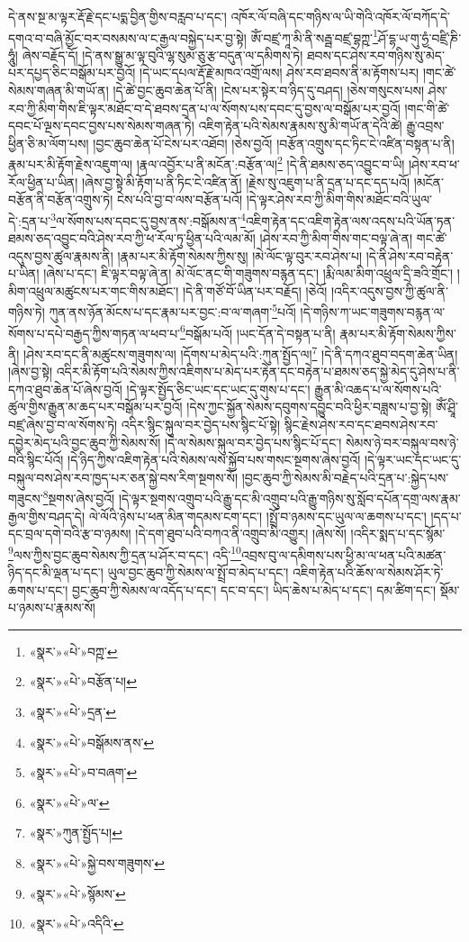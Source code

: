 དེ་ནས་སྔ་མ་ལྟར་རྡོ་རྗེ་དང་པདྨ་བྱིན་གྱིས་བརླབ་པ་དང་། འཁོར་ལོ་བཞི་དང་གཉིས་ལ་ཡི་གེའི་འཁོར་ལོ་བཀོད་དེ་དགའ་བ་བཞི་མྱོང་བར་བསམས་ལ་ང་རྒྱལ་བསྐྱེད་པར་བྱ་སྟེ། ཨོཾ་བཛྲ་ཀཱ་མི་ནི་སརྦྦ་བཛྲ་བྷཀྵ་\footnote{«སྣར་»«པེ་»བཀྵ་}ཤོ་དྷ་ཡ་གུ་ཧྱཾ་བཛྲི་ཎི་ཧཱུཾ། ཞེས་བརྗོད་དོ། །དེ་ནས་སྒྱུ་མ་ལྟ་བུའི་ལྷ་སུམ་ཅུ་རྩ་བདུན་ལ་དམིགས་ཏེ། ཐབས་དང་ཤེས་རབ་གཉིས་སུ་མེད་པར་དཔྱད་ཅིང་བསྒོམ་པར་བྱའོ། །དེ་ཡང་དཔལ་རྡོ་རྗེ་མཁའ་འགྲོ་ལས། ཤེས་རབ་ཐབས་ནི་མ་རྟོགས་པར། །གང་ཚེ་སེམས་གཞན་མི་གཡོ་ན། །དེ་ཚེ་བྱང་ཆུབ་ཆེན་པོ་ནི། །ངེས་པར་སྟེར་བ་ཉིད་དུ་བཤད། །ཅེས་གསུངས་པས། ཤེས་རབ་ཀྱི་མིག་གིས་ཇི་ལྟར་མཐོང་བ་དེ་ཐབས་དྲན་པ་ལ་སོགས་པས་དབང་དུ་བྱས་ལ་བསྒོམ་པར་བྱའོ། །གང་གི་ཚེ་དབང་པོ་ལྔས་དབང་བྱས་པས་སེམས་གཞན་ཏེ། འཇིག་རྟེན་པའི་སེམས་རྣམས་སུ་མི་གཡོ་ན་དེའི་ཚེ། རྒྱུ་འབྲས་ཕྱིན་ཅི་མ་ལོག་པས། །བྱང་ཆུབ་ཆེན་པོ་ངེས་པར་འཐོབ། །ཅེས་བྱའོ། །བརྩོན་འགྲུས་དང་ཏིང་ངེ་འཛིན་བསྟན་པ་ནི། རྣམ་པར་མི་རྟོག་རྗེས་འཇུག་ལ། །རྣལ་འབྱོར་པ་ནི་མངོན་:བརྩོན་ལ།\footnote{«སྣར་»«པེ་»བརྩོན་པ།} །དེ་ནི་ཐམས་ཅད་འབྱུང་བ་ཡི། །ཤེས་རབ་ཕ་རོལ་ཕྱིན་པ་ཡིན། །ཞེས་བྱ་སྟེ་མི་རྟོག་པ་ནི་ཏིང་ངེ་འཛིན་ནོ། །རྗེས་སུ་འཇུག་པ་ནི་དྲན་པ་དང་དད་པའོ། །མངོན་བརྩོན་ནི་བརྩོན་འགྲུས་ཏེ། ངེས་པའི་བྱ་བ་ལས་བརྩོན་པའོ། །དེ་ལྟར་ཤེས་རབ་ཀྱི་མིག་གིས་མཐོང་བའི་ཡུལ་དེ་:དྲན་པ་\footnote{«སྣར་»«པེ་»དྲན་}ལ་སོགས་པས་དབང་དུ་བྱས་ནས་:བསྒོམས་ན་\footnote{«སྣར་»«པེ་»བསྒོམས་ནས་}འཇིག་རྟེན་དང་འཇིག་རྟེན་ལས་འདས་པའི་ཡོན་ཏན་ཐམས་ཅད་འབྱུང་བའི་ཤེས་རབ་ཀྱི་ཕ་རོལ་ཏུ་ཕྱིན་པའི་ལམ་མོ། །ཤེས་རབ་ཀྱི་མིག་གིས་གང་བལྟ་ཞེ་ན། གང་ཚེ་འདུས་བྱས་ཚུལ་རྣམས་ནི། །རྣམ་པར་མི་རྟོག་སེམས་ཀྱིས་སུ། །མེ་ལོང་ལྟ་བུར་རབ་ཤེས་པ། །དེ་ནི་ཤེས་རབ་བརྟེན་པ་ཡིན། །ཞེས་པ་དང་། ཇི་ལྟར་བལྟ་ཞེ་ན། མེ་ལོང་ནང་གི་གཟུགས་བརྙན་དང་། །རྨི་ལམ་མིག་འཕྲུལ་དྲི་ཟའི་གྲོང་། །མིག་འཕྲུལ་མཚུངས་པར་གང་གིས་མཐོང་། །དེ་ནི་གཙོ་བོ་ཡིན་པར་བརྗོད། །ཅེའོ། །འདིར་འདུས་བྱས་ཀྱི་ཚུལ་ནི་གཉིས་ཏེ། ཀུན་ནས་ཉོན་མོངས་པ་དང་རྣམ་པར་བྱང་:བ་ལ་གཞག་\footnote{«སྣར་»«པེ་»བ་བཞག་}པའོ། །དེ་གཉིས་ཀ་ཡང་གཟུགས་བརྙན་ལ་སོགས་པ་དཔེ་བརྒྱད་ཀྱིས་གཏན་ལ་ཕབ་པ་\footnote{«སྣར་»«པེ་»ལ་}བསྒོམ་པའོ། །ཡང་དོན་དེ་བསྟན་པ་ནི། རྣམ་པར་མི་རྟོག་སེམས་ཀྱིས་ནི། །ཤེས་རབ་དང་ནི་མཚུངས་གཟུགས་ལ། །དོགས་པ་མེད་པའི་:ཀུན་སྤྱོད་ལ།\footnote{«སྣར་»ཀུན་སྤྱོད་པ།} །དེ་ནི་དཀའ་ཐུབ་བདག་ཆེན་ཡིན། །ཞེས་བྱ་སྟེ། འདིར་མི་རྟོག་པའི་སེམས་ཀྱིས་འཇིགས་པ་མེད་པར་རྟེན་དང་བརྟེན་པ་ཐམས་ཅད་སྐྱེ་མེད་དུ་ཤེས་པ་ནི་དཀའ་ཐུབ་ཆེན་པོ་ཞེས་བྱའོ། །དེ་ལྟར་སྤྱོད་ཅིང་ཡང་དང་ཡང་དུ་གུས་པ་དང་། རྒྱུན་མི་འཆད་པ་ལ་སོགས་པའི་ཚུལ་གྱིས་རྒྱུན་མ་ཆད་པར་བསྒོམ་པར་བྱའོ། །དེས་ཀྱང་སྐྱོན་སེམས་དབུགས་དབྱུང་བའི་ཕྱིར་བཟླས་པ་བྱ་སྟེ། ཨོཾ་ཤྲཱི་བཛྲ་ཞེས་བྱ་བ་ལ་སོགས་ཏེ། འདིར་སྙིང་སྐུལ་བར་བྱེད་པས་སྙིང་པོ་སྟེ། སྙིང་རྗེས་ཤེས་རབ་དང་ཐབས་ཤེས་རབ་དབྱེར་མེད་པའི་བྱང་ཆུབ་ཀྱི་སེམས་སོ། །དེ་ལ་སེམས་སྐུལ་བར་བྱེད་པས་སྙིང་པོ་དང་། སེམས་ཉེ་བར་བསྐུལ་བས་ཉེ་བའི་སྙིང་པོའོ། །དེ་ཉིད་ཀྱིས་འཇིག་རྟེན་པའི་སེམས་ལས་སྐྱོབ་པས་གསང་སྔགས་ཞེས་བྱའོ། །དེ་ལྟར་ཡང་དང་ཡང་དུ་བསྐུལ་བས་ཤེས་རབ་ཁྱད་པར་ཅན་སྐྱེ་བས་རིག་སྔགས་སོ། །བྱང་ཆུབ་ཀྱི་སེམས་མི་བརྗེད་པའི་དྲན་པ་:སྐྱེད་པས་གཟུངས་\footnote{«སྣར་»«པེ་»སྐྱེ་བས་གཟུགས་}སྔགས་ཞེས་བྱའོ། །དེ་ལྟར་སྔགས་འགྲུབ་པའི་རྒྱུ་དང་མི་འགྲུབ་པའི་རྒྱུ་གཉིས་སུ་སློབ་དཔོན་དགྲ་ལས་རྣམ་རྒྱལ་གྱིས་བཤད་དེ། ལེ་ལོའི་ཉེས་པ་ཕན་མིན་གདམས་ངག་དང་། །སྤྲོ་བ་ཉམས་དང་ཡུལ་ལ་ཆགས་པ་དང་། །དད་པ་དང་བྲལ་དགེ་བའི་རྩ་བ་ཉམས། །དེ་དག་ཐུབ་པའི་བཀའ་ནི་འགྲུབ་མི་འགྱུར། །ཞེས་སོ། །འདིར་སྨད་པ་དང་སྙོམ་\footnote{«སྣར་»«པེ་»སྙོམས་}ལས་ཀྱིས་བྱང་ཆུབ་སེམས་ཀྱི་དྲན་པ་ཤོར་བ་དང་། འདི་\footnote{«སྣར་»«པེ་»འདིའི་}འབྲས་བུ་ལ་དམིགས་པས་ཕྱི་མ་ལ་ཕན་པའི་མཚན་ཉིད་དང་མི་ལྡན་པ་དང་། ཡུལ་བྱང་ཆུབ་ཀྱི་སེམས་ལ་སྤྲོ་བ་མེད་པ་དང་། འཇིག་རྟེན་པའི་ཆོས་ལ་སེམས་ཤོར་ཏེ་ཆགས་པ་དང་། བྱང་ཆུབ་ཀྱི་སེམས་ལ་འདོད་པ་དང་། དང་བ་དང་། ཡིད་ཆེས་པ་མེད་པ་དང་། དམ་ཚིག་དང་། སྡོམ་པ་ཉམས་པ་རྣམས་སོ། 